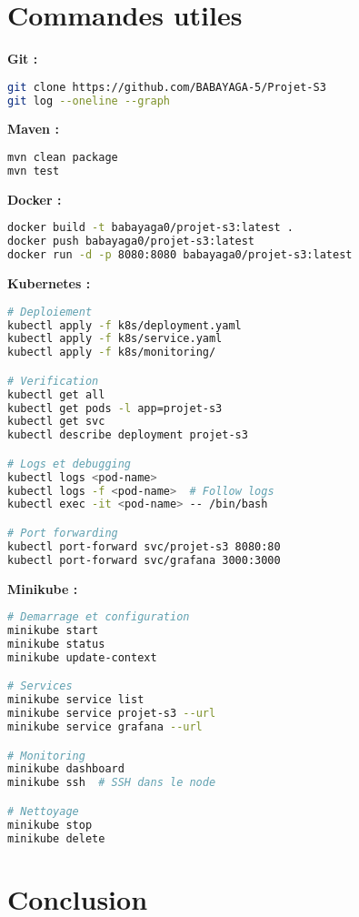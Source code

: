 \documentclass[11pt,a4paper]{article}
\begin{document}
\section{Commandes utiles}

\textbf{Git :}
\begin{lstlisting}[language=bash]
git clone https://github.com/BABAYAGA-5/Projet-S3
git log --oneline --graph
\end{lstlisting}

\textbf{Maven :}
\begin{lstlisting}[language=bash]
mvn clean package
mvn test
\end{lstlisting}

\textbf{Docker :}
\begin{lstlisting}[language=bash]
docker build -t babayaga0/projet-s3:latest .
docker push babayaga0/projet-s3:latest
docker run -d -p 8080:8080 babayaga0/projet-s3:latest
\end{lstlisting}

\textbf{Kubernetes :}
\begin{lstlisting}[language=bash]
# Deploiement
kubectl apply -f k8s/deployment.yaml
kubectl apply -f k8s/service.yaml
kubectl apply -f k8s/monitoring/

# Verification
kubectl get all
kubectl get pods -l app=projet-s3
kubectl get svc
kubectl describe deployment projet-s3

# Logs et debugging
kubectl logs <pod-name>
kubectl logs -f <pod-name>  # Follow logs
kubectl exec -it <pod-name> -- /bin/bash

# Port forwarding
kubectl port-forward svc/projet-s3 8080:80
kubectl port-forward svc/grafana 3000:3000
\end{lstlisting}

\textbf{Minikube :}
\begin{lstlisting}[language=bash]
# Demarrage et configuration
minikube start
minikube status
minikube update-context

# Services
minikube service list
minikube service projet-s3 --url
minikube service grafana --url

# Monitoring
minikube dashboard
minikube ssh  # SSH dans le node

# Nettoyage
minikube stop
minikube delete
\end{lstlisting}

\newpage

\section{Conclusion}
\end{document}
